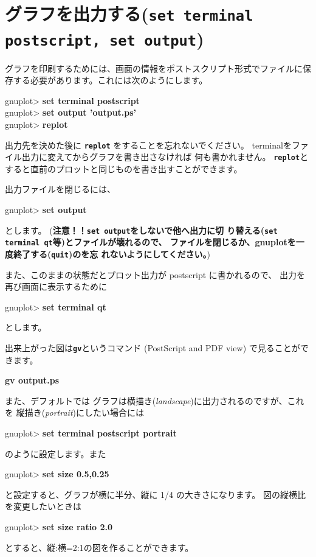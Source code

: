 \documentclass[a4j]{ujarticle} %
\newenvironment{terminal}{%
  \begin{center}
   \begin{minipage}{.8\textwidth}
    \setlength{\FrameSep}{.5\FrameSep}%
    \begin{framed}\ttfamily\small%
     \setlength\baselineskip{.85\baselineskip}%
}{%
    \end{framed}
   \end{minipage}
  \end{center}%
}
\begin{document}
\section{グラフを出力する({\tt\bf set terminal postscript, set output})}
グラフを印刷するためには、画面の情報をポストスクリプト形式でファイルに保存する必要があります。これには次のようにします。
\begin{terminal}
 gnuplot> {\bf set terminal postscript} \\
 gnuplot> {\bf set output 'output.ps'} \\
 gnuplot> {\bf replot}
\end{terminal}
出力先を決めた後に {\tt\bf replot} をすることを忘れないでください。
terminalをファイル出力に変えてからグラフを書き出さなければ
何も書かれません。
{\tt\bf replot}とすると直前のプロットと同じものを書き出すことができます。

出力ファイルを閉じるには、
\begin{terminal}
 gnuplot> {\bf set output}
\end{terminal}
とします。
(\textbf{注意！！{\tt\bf set output}をしないで他へ出力に切
り替える({\tt\bf set terminal qt}等)とファイルが壊れるので、
ファイルを閉じるか、gnuplotを一度終了する({\tt\bf quit})のを忘
れないようにしてください。})

また、このままの状態だとプロット出力が postscript に書かれるので、
出力を再び画面に表示するために
\begin{terminal}
 gnuplot> {\bf set terminal qt}
\end{terminal}
とします。

出来上がった図は{\tt\bf gv}というコマンド (PostScript and PDF view) で見ることができます。
\begin{terminal}
{\bf gv output.ps}
\end{terminal}

また、デフォルトでは
グラフは横描き({\it landscape})に出力されるのですが、これを
縦描き({\it portrait})にしたい場合には
\begin{terminal}
 gnuplot> {\bf set terminal postscript portrait}
\end{terminal}
のように設定します。また
\begin{terminal}
 gnuplot> {\bf set size 0.5,0.25}
\end{terminal}
と設定すると、グラフが横に半分、縦に 1/4 の大きさになります。
図の縦横比を変更したいときは
\begin{terminal}
 gnuplot> {\bf set size ratio 2.0}
\end{terminal}
とすると、縦:横=2:1の図を作ることができます。
\end{document}
